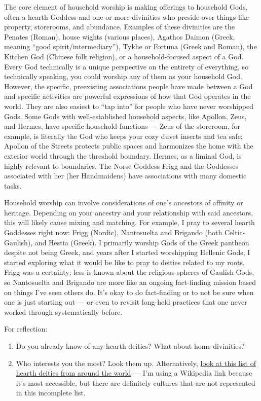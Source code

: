 \documentclass[
]{book}
\providecommand{\tightlist}{%
  \setlength{\itemsep}{0pt}\setlength{\parskip}{0pt}}
\begin{document}
The core element of household worship is making offerings to household Gods, often a hearth Goddess and one or more divinities who preside over things like property, storerooms, and abundance. Examples of these divinities are the Penates (Roman), house wights (various places), Agathos Daimon (Greek, meaning ``good spirit/intermediary''), Tykhe or Fortuna (Greek and Roman), the Kitchen God (Chinese folk religion), or a household-focused aspect of a God. Every God technically is a unique perspective on the entirety of everything, so technically speaking, you could worship any of them as your household God. However, the specific, preexisting associations people have made between a God and specific activities are powerful expressions of how that God operates in the world. They are also easiest to ``tap into'' for people who have never worshipped Gods. Some Gods with well-established household aspects, like Apollon, Zeus, and Hermes, have specific household functions --- Zeus of the storeroom, for example, is literally the God who keeps your cozy duvet inserts and tea safe; Apollon of the Streets protects public spaces and harmonizes the home with the exterior world through the threshold boundary. Hermes, as a liminal God, is highly relevant to boundaries. The Norse Goddess Frigg and the Goddesses associated with her (her Handmaidens) have associations with many domestic tasks.

Household worship can involve considerations of one's ancestors of affinity or heritage. Depending on your ancestry and your relationship with said ancestors, this will likely cause mixing and matching. For example, I pray to several hearth Goddesses right now: Frigg (Nordic), Nantosuelta and Brigando (both Celtic-Gaulish), and Hestia (Greek). I primarily worship Gods of the Greek pantheon despite not being Greek, and years after I started worshipping Hellenic Gods, I started exploring what it would be like to pray to deities related to my roots. Frigg was a certainty; less is known about the religious spheres of Gaulish Gods, so Nantosuelta and Brigando are more like an ongoing fact-finding mission based on things I've seen others do. It's okay to do fact-finding or to not be sure when one is just starting out --- or even to revisit long-held practices that one never worked through systematically before.

For reflection:

\begin{enumerate}
\def\labelenumi{\arabic{enumi}.}
\tightlist
\item
  Do you already know of any hearth deities? What about home divinities?
\item
  Who interests you the most? Look them up. Alternatively, \href{https://en.wikipedia.org/wiki/Household_deity\#List}{look at this list of hearth deities from around the world} --- I'm using a Wikipedia link because it's most accessible, but there are definitely cultures that are not represented in this incomplete list.
\end{enumerate}
\end{document}
